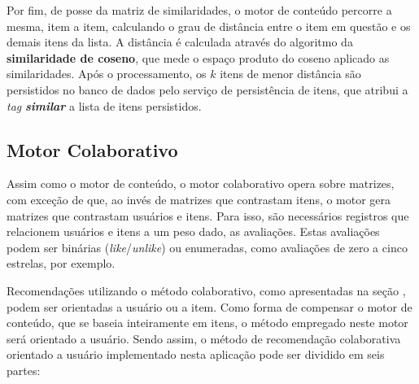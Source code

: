Por fim, de posse da matriz de similaridades, o motor de conteúdo percorre a mesma, item a item, calculando o grau de distância entre o item em questão e os demais itens da lista. A distância é calculada através do algoritmo da \textbf{similaridade de coseno}, que mede o espaço produto do coseno aplicado as similaridades. Após o processamento, os $k$ itens de menor distância são persistidos no banco de dados pelo serviço de persistência de itens, que atribui a \textit{tag} \textbf{\textit{similar}} a lista de itens persistidos.

\subsection{Motor Colaborativo} \label{motor:colaborativo}

Assim como o motor de conteúdo, o motor colaborativo opera sobre matrizes, com exceção de que, ao invés de matrizes que contrastam itens, o motor gera matrizes que contrastam usuários e itens. Para isso, são necessários registros que relacionem usuários e itens a um peso dado, as avaliações. Estas avaliações podem ser binárias (\textit{like}/\textit{unlike}) ou enumeradas, como avaliações de zero a cinco estrelas, por exemplo.

Recomendações utilizando o método colaborativo, como apresentadas na seção , podem ser orientadas a usuário ou a item. Como forma de compensar o motor de conteúdo, que se baseia inteiramente em itens, o método empregado neste motor será orientado a usuário. Sendo assim, o método de recomendação colaborativa orientado a usuário implementado nesta aplicação pode ser dividido em seis partes:

